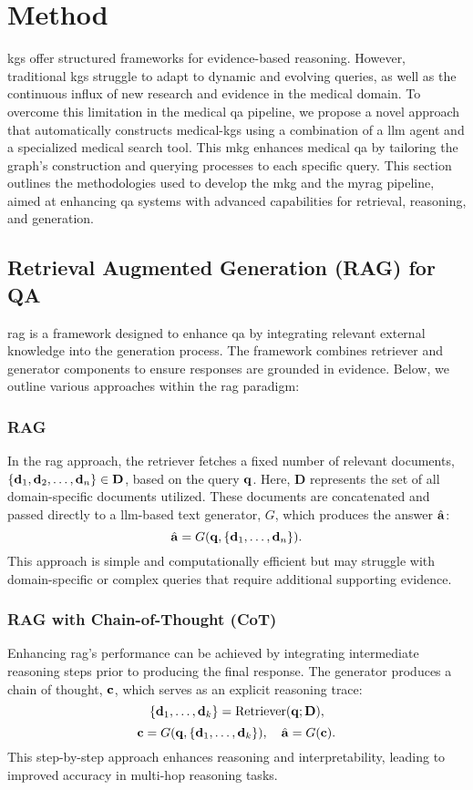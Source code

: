 \glsresetall
\section{Method}
\glspl{kg} offer structured frameworks for evidence-based reasoning. However, traditional \glspl{kg} struggle to adapt to dynamic and evolving queries, as well as the continuous influx of new research and evidence in the medical domain. To overcome this limitation in the medical \gls{qa} pipeline, we propose a novel approach that automatically constructs medical-\glspl{kg} using a combination of a \gls{llm} agent and a specialized medical search tool. This \gls{mkg} enhances medical \gls{qa} by tailoring the graph's construction and querying processes to each specific query. This section outlines the methodologies used to develop the \gls{mkg} and the \gls{myrag} pipeline, aimed at enhancing \gls{qa} systems with advanced capabilities for retrieval, reasoning, and generation.

\subsection{Retrieval Augmented Generation (RAG) for QA}

\gls{rag} is a framework designed to enhance \gls{qa} by integrating relevant external knowledge into the generation process. The framework combines retriever and generator components to ensure responses are grounded in evidence. Below, we outline various approaches within the \gls{rag} paradigm:

\subsubsection{RAG}
In the \gls{rag} approach, the retriever fetches a fixed number of relevant documents, $\{{\mathbf{d}}_1, {\mathbf{d}}_2, \ldots, {\mathbf{d}}_n\} \in \mathbf{D}$, based on the query ${\mathbf{q}}$. Here, $\mathbf{D}$ represents the set of all domain-specific documents utilized. These documents are concatenated and passed directly to a \gls{llm}-based text generator, $G$, which produces the answer $\hat{{\mathbf{a}}}$:
\[
\hat{{\mathbf{a}}} = G({\mathbf{q}}, \{{\mathbf{d}}_1, \ldots, {\mathbf{d}}_n\}).
\]
This approach is simple and computationally efficient but may struggle with domain-specific or complex queries that require additional supporting evidence.

\subsubsection{RAG with Chain-of-Thought (CoT)}
Enhancing \gls{rag}'s performance can be achieved by integrating intermediate reasoning steps prior to producing the final response. The generator produces a chain of thought, ${\mathbf{c}}$, which serves as an explicit reasoning trace:
\[
\{{\mathbf{d}}_1, \ldots, {\mathbf{d}}_k\} = \text{Retriever}({\mathbf{q}}; \mathbf{D}),\] \[{\mathbf{c}} = G({\mathbf{q}}, \{{\mathbf{d}}_1, \ldots, {\mathbf{d}}_k\}),\quad \hat{{\mathbf{a}}} = G({\mathbf{c}}).
\]
This step-by-step approach enhances reasoning and interpretability, leading to improved accuracy in multi-hop reasoning tasks.

